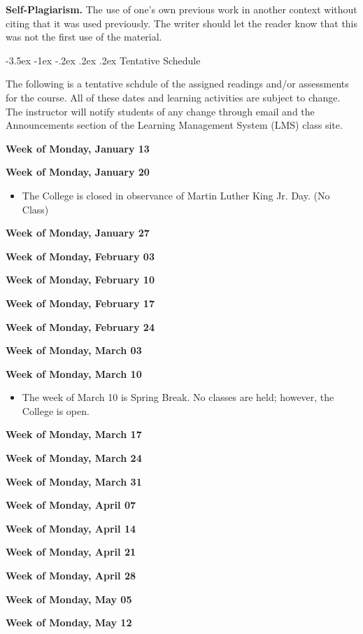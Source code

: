 \documentclass[11pt]{article}
\makeatletter
\renewcommand\section{\@startsection{section}{1}{0pt}%
  {-3.5ex \@plus -1ex \@minus -.2ex}%
  {.2ex \@plus.2ex}%
  {\normalfont\Large\bfseries}} %
\makeatother
\begin{document}
\textbf{Self-Plagiarism.} The use of one's own previous work in another context without citing that it was used previously. The writer should let the reader know that this was not the first use of the material.

\pagebreak
\section{Tentative Schedule}

The following is a tentative schdule of the assigned readings and/or assessments for the course. All of these dates and learning activities are subject to change. The instructor will notify students of any change through email and the Announcements section of the Learning Management System (LMS) class site.

\textbf{Week of Monday, January 13}

\textbf{Week of Monday, January 20}

\begin{itemize}
\item The College is closed in observance of Martin Luther King Jr. Day. (No Class)
\end{itemize}

\textbf{Week of Monday, January 27}

\textbf{Week of Monday, February 03}

\textbf{Week of Monday, February 10}

\textbf{Week of Monday, February 17}

\textbf{Week of Monday, February 24}

\textbf{Week of Monday, March 03}

\textbf{Week of Monday, March 10}

\begin{itemize}
\item The week of March 10 is Spring Break. No classes are held; however, the College is open.
\end{itemize}

\textbf{Week of Monday, March 17}

\textbf{Week of Monday, March 24}

\textbf{Week of Monday, March 31}

\textbf{Week of Monday, April 07}

\textbf{Week of Monday, April 14}

\textbf{Week of Monday, April 21}

\textbf{Week of Monday, April 28}

\textbf{Week of Monday, May 05}

\textbf{Week of Monday, May 12}
\end{document}
